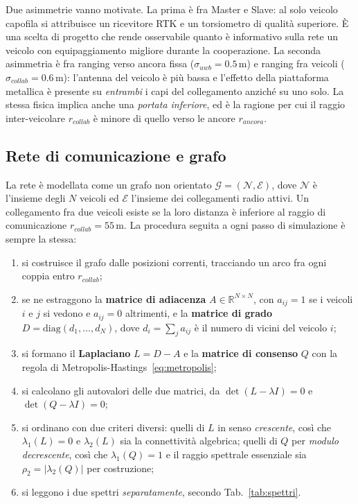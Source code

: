 \documentclass[conference,9pt]{IEEEtran}
\begin{document}
Due asimmetrie vanno motivate. La prima \`e fra Master e Slave: al solo
veicolo capofila si attribuisce un ricevitore RTK e un torsiometro di qualit\`a
superiore. \`E una scelta di progetto che rende osservabile quanto \`e
informativo sulla rete un veicolo con equipaggiamento migliore durante la
cooperazione. La seconda asimmetria \`e fra ranging verso ancora fissa
($\sigma_{uwb} = 0.5$\,m) e ranging fra veicoli ($\sigma_{collab} = 0.6$\,m): l'antenna del
veicolo \`e pi\`u bassa e l'effetto della piattaforma metallica \`e presente su
\emph{entrambi} i capi del collegamento anzich\'e su uno solo. La stessa fisica
implica anche una \emph{portata inferiore}, ed \`e la ragione per cui il raggio
inter-veicolare $r_{collab}$ \`e minore di quello verso le ancore $r_{ancora}$.

\subsection{Rete di comunicazione e grafo}
\label{sub:grafo}

La rete \`e modellata come un grafo non orientato
$\mathcal{G} = (\mathcal{N}, \mathcal{E})$, dove $\mathcal{N}$ \`e l'insieme
degli $N$ veicoli ed $\mathcal{E}$ l'insieme dei collegamenti radio attivi.
Un collegamento fra due veicoli esiste se la loro distanza \`e inferiore al
raggio di comunicazione $r_{collab} = 55$\,m. La procedura seguita a ogni passo
di simulazione \`e sempre la stessa:

\begin{enumerate}
\item si costruisce il grafo dalle posizioni correnti, tracciando un arco fra
      ogni coppia entro $r_{collab}$;
\item se ne estraggono la \textbf{matrice di adiacenza}
      $A \in \mathbb{R}^{N\times N}$, con $a_{ij}=1$ se i veicoli $i$ e $j$ si
      vedono e $a_{ij}=0$ altrimenti, e la \textbf{matrice di grado}
      $D = \mathrm{diag}(d_1,\dots,d_N)$, dove $d_i = \sum_j a_{ij}$ \`e il
      numero di vicini del veicolo $i$;
\item si formano il \textbf{Laplaciano} $L = D - A$ e la \textbf{matrice di
      consenso} $Q$ con la regola di Metropolis-Hastings~\eqref{eq:metropolis};
\item si calcolano gli autovalori delle due matrici, da $\det(L - \lambda I)=0$
      e $\det(Q - \lambda I)=0$;
\item si ordinano con due criteri diversi: quelli di $L$ in senso
      \emph{crescente}, cos\`i che $\lambda_1(L) = 0$ e $\lambda_2(L)$ sia la
      connettivit\`a algebrica; quelli di $Q$ per \emph{modulo decrescente},
      cos\`i che $\lambda_1(Q) = 1$ e il raggio spettrale essenziale sia
      $\rho_2 = |\lambda_2(Q)|$ per costruzione;
\item si leggono i due spettri \emph{separatamente}, secondo
      Tab.~\ref{tab:spettri}.
\end{enumerate}
\end{document}
